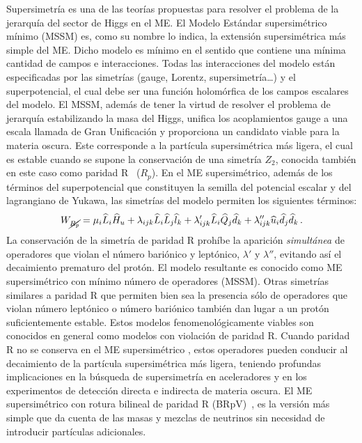 Supersimetría \cite{Martin:1997ns,Haber:1984rc} es una de las teorías
propuestas para resolver el problema de la jerarquía del sector de Higgs
en el ME. El Modelo Estándar supersimétrico mínimo (MSSM) es, como su
nombre lo indica, la extensión supersimétrica más simple del ME.
Dicho modelo es mínimo en el sentido que contiene una mínima cantidad de campos
e interacciones.
Todas las interacciones del modelo están especificadas por las simetrías
(gauge, Lorentz, supersimetría\dots) y el superpotencial,
el cual debe ser una función holomórfica de los campos escalares del
modelo. El MSSM, además de tener la virtud de resolver el problema de jerarquía
estabilizando la masa del Higgs, unifica los acoplamientos gauge a una escala
llamada de Gran Unificación y proporciona un candidato viable para la materia
oscura. Este corresponde a la partícula supersimétrica más ligera, el
cual es estable cuando se supone la conservación de una simetría $Z_2$,
conocida también en este caso como paridad R~\cite{Ellis:1983ew} ($R_p$).
En el ME supersimétrico, además de los términos
del superpotencial que constituyen la semilla del potencial escalar y
del lagrangiano de Yukawa, las simetrías del modelo permiten los siguientes
términos:
\begin{equation}
  \label{eq:5}
  W_{\cancel{R_p}} = \mu_i\widehat{L}_i\widehat{H}_u + 
  \lambda_{i j k}\widehat{L}_i\widehat{L}_j\widehat{l}_k +
  \lambda'_{i j k}\widehat{L}_i\widehat{Q}_j\widehat{d}_k + 
  \lambda''_{ijk}\widehat{u}_i\widehat{d}_j\widehat{d}_k\,.
\end{equation}
La conservación de la simetría de paridad R prohíbe la aparición
\emph{simultánea} de operadores que violan el número bariónico y
leptónico, $\lambda'$ y $\lambda''$, evitando así el decaimiento
prematuro del protón. El modelo resultante es conocido como ME supersimétrico con mínimo
número de operadores (MSSM). Otras simetrías similares a paridad R
que permiten bien sea la presencia sólo de operadores que violan número
leptónico o número bariónico también dan lugar a un protón
suficientemente estable. Estos modelos fenomenológicamente viables son
conocidos en general como modelos con violación de paridad R. Cuando
paridad R no se conserva en el ME supersimétrico
\cite{Barbier:2004ez}, estos operadores pueden conducir al decaimiento
de la partícula supersimétrica más ligera, teniendo profundas
implicaciones en la búsqueda de supersimetría en aceleradores y en los
experimentos de detección directa e indirecta de materia oscura. El
ME supersimétrico con rotura bilineal de paridad R
(BRpV)~\cite{Diaz:1997xc,Hirsch:2000ef,Diaz:2003as}, es la versión más simple que da cuenta de las masas y
mezclas de neutrinos sin necesidad de introducir partículas
adicionales. 

